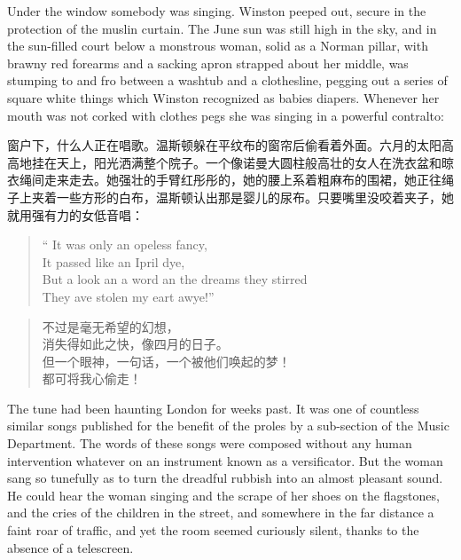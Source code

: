 \begin{paracol}{2}
\switchcolumn*

Under the window somebody was singing. Winston peeped out, secure in the
protection of the muslin curtain. The June sun was still high in the
sky, and in the sun-filled court below a monstrous woman, solid as a
Norman pillar, with brawny red forearms and a sacking apron strapped
about her middle, was stumping to and fro between a washtub and a
clothesline, pegging out a series of square white things which Winston
recognized as babies\textquotesingle{} diapers. Whenever her mouth was
not corked with clothes pegs she was singing in a powerful contralto:

\switchcolumn

窗户下，什么人正在唱歌。温斯顿躲在平纹布的窗帘后偷看着外面。六月的太阳高高地挂在天上，阳光洒满整个院子。一个像诺曼大圆柱般高壮的女人在洗衣盆和晾衣绳间走来走去。她强壮的手臂红彤彤的，她的腰上系着粗麻布的围裙，她正往绳子上夹着一些方形的白布，温斯顿认出那是婴儿的尿布。只要嘴里没咬着夹子，她就用强有力的女低音唱：

\switchcolumn*

\begin{quotation}
  \noindent`` It was only an \textquotesingle opeless fancy,\\
  It passed like an Ipril dye,\\
  But a look an\textquotesingle{} a word an\textquotesingle{} the
  dreams they stirred\\
  They \textquotesingle ave stolen my \textquotesingle eart awye!''
\end{quotation}

\switchcolumn

\begin{quotation}
\noindent 不过是毫无希望的幻想，\\
消失得如此之快，像四月的日子。\\
但一个眼神，一句话，一个被他们唤起的梦！\\
都可将我心偷走！
\end{quotation}

\switchcolumn*

The tune had been haunting London for weeks past. It was one of
countless similar songs published for the benefit of the proles by a
sub-section of the Music Department. The words of these songs were
composed without any human intervention whatever on an instrument known
as a versificator. But the woman sang so tunefully as to turn the
dreadful rubbish into an almost pleasant sound. He could hear the woman
singing and the scrape of her shoes on the flagstones, and the cries of
the children in the street, and somewhere in the far distance a faint
roar of traffic, and yet the room seemed curiously silent, thanks to the
absence of a telescreen.


\end{paracol}
